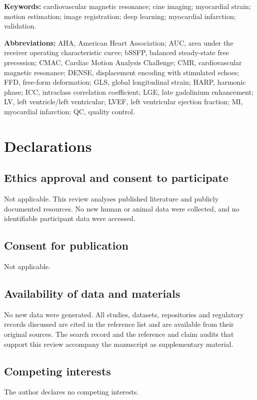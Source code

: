 \documentclass[11pt,a4paper]{article}
\begin{document}
\vspace{-0.6em}
\noindent\textbf{Keywords:}
cardiovascular magnetic resonance;
cine imaging;
myocardial strain;
motion estimation;
image registration;
deep learning;
myocardial infarction;
validation.

\vspace{0.5em}
\noindent\textbf{Abbreviations:}
AHA, American Heart Association;
AUC, area under the receiver operating characteristic curve;
bSSFP, balanced steady-state free precession;
CMAC, Cardiac Motion Analysis Challenge;
CMR, cardiovascular magnetic resonance;
DENSE, displacement encoding with stimulated echoes;
FFD, free-form deformation;
GLS, global longitudinal strain;
HARP, harmonic phase;
ICC, intraclass correlation coefficient;
LGE, late gadolinium enhancement;
LV, left ventricle/left ventricular;
LVEF, left ventricular ejection fraction;
MI, myocardial infarction;
QC, quality control.




\clearpage
\section*{Declarations}

\subsection*{Ethics approval and consent to participate}
Not applicable. This review analyses published literature and publicly documented resources. No new
human or animal data were collected, and no identifiable participant data were accessed.

\subsection*{Consent for publication}
Not applicable.

\subsection*{Availability of data and materials}
No new data were generated. All studies, datasets, repositories and regulatory records discussed are
cited in the reference list and are available from their original sources. The search record and the
reference and claim audits that support this review accompany the manuscript as supplementary
material.

\subsection*{Competing interests}
The author declares no competing interests.
\end{document}

